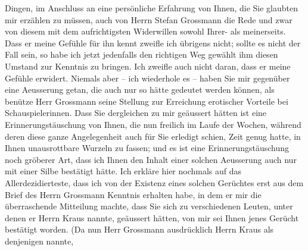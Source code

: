 {\begin{ledgroupsized}[t]{13cm}
               Dingen, im Anschluss an eine persönliche Erfahrung von Ihnen, die Sie glaubten mir
               erzählen zu müssen, auch von Herrn Stefan
                  Grossmann die Rede und zwar von diesem mit dem aufrichtigsten Widerwillen
               sowohl Ihrer- als meinerseits. Dass er meine Gefühle für ihn kennt zweifle ich
               übrigens nicht; sollte es nicht der Fall sein, so habe ich jetzt jedenfalls den
               richtigen {\pb}Weg gewählt ihm diesen Umstand zur Kenntnis zu
               bringen. Ich zweifle auch nicht daran, dass er meine Gefühle erwidert. Niemals aber –
               ich wiederhole es – haben Sie mir gegenüber eine Aeusserung getan, die auch nur so
               hätte gedeutet werden können, als benütze Herr Grossmann seine Stellung zur Erreichung erotischer Vorteile bei
               Schauspielerinnen. Dass Sie dergleichen zu mir geäussert hätten ist eine
               Erinnerungstäuschung von Ihnen, die nun freilich im Laufe der Wochen, während deren
               diese ganze Angelegenheit \introOben{}auch\introOben{} für Sie erledigt
               schien, Zeit genug hatte, in Ihnen unausrottbare Wurzeln zu fassen; und es ist eine
               Erinnerungstäuschung noch gröberer Art, dass ich Ihnen den Inhalt einer solchen
               Aeusserung auch nur mit einer Silbe bestätigt hätte. Ich erkläre hier nochmals auf
               das Allerdezidierteste, dass ich von der Existenz eines solchen Gerüchtes erst aus
               dem Brief des Herrn Grossmann Kenntnis erhalten
               habe, in dem er mir die überraschende Mitteilung machte, dass Sie sich zu
               verschiedenen Leuten, unter denen er Herrn Kraus
               nannte, geäussert hätten, von mir sei Ih{\pb}nen jenes Gerücht
               bestätigt worden. (Da nun Herr Grossmann
               ausdrücklich Herrn Kraus als denjenigen nannte,

\end{ledgroupsized}}
